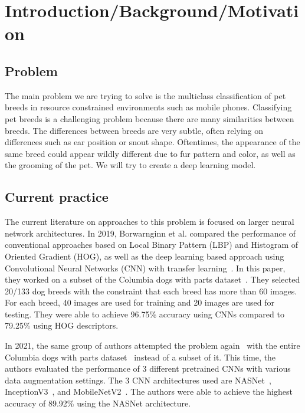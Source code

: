 \documentclass[10pt,twocolumn,letterpaper]{article}
\begin{document}
\section{Introduction/Background/Motivation}
\subsection{Problem}
The main problem we are trying to solve is the multiclass classification of pet breeds in resource constrained environments such as mobile phones. Classifying pet breeds is a challenging problem because there are many similarities between breeds. The differences between breeds are very subtle, often relying on differences such as ear position or snout shape. Oftentimes, the appearance of the same breed could appear wildly different due to fur pattern and color, as well as the grooming of the pet. We will try to create a deep learning model.

\subsection{Current practice}
The current literature on approaches to this problem is focused on larger neural network architectures. In 2019, Borwarnginn et al. compared the performance of conventional approaches based on Local Binary Pattern (LBP) and Histogram of Oriented Gradient (HOG), as well as the deep learning based approach using Convolutional Neural Networks (CNN) with transfer learning~\cite{8929955}. In this paper, they worked on a subset of the Columbia dogs with parts dataset~\cite{10.1007/978-3-642-33718-5_13}. They selected 20/133 dog breeds with the constraint that each breed has more than 60 images. For each breed, 40 images are used for training and 20 images are used for testing. They were able to achieve 96.75\% accuracy using CNNs compared to 79.25\% using HOG descriptors.

In 2021, the same group of authors attempted the problem again~\cite{borwarnginn2021knowing} with the entire Columbia dogs with parts dataset~\cite{10.1007/978-3-642-33718-5_13} instead of a subset of it. This time, the authors evaluated the performance of 3 different pretrained CNNs with various data augmentation settings. The 3 CNN architectures used are NASNet~\cite{qin2019nasnet}, InceptionV3~\cite{szegedy2016rethinking}, and MobileNetV2~\cite{sandler2018mobilenetv2}. The authors were able to achieve the highest accuracy of 89.92\% using the NASNet architecture.
\end{document}
